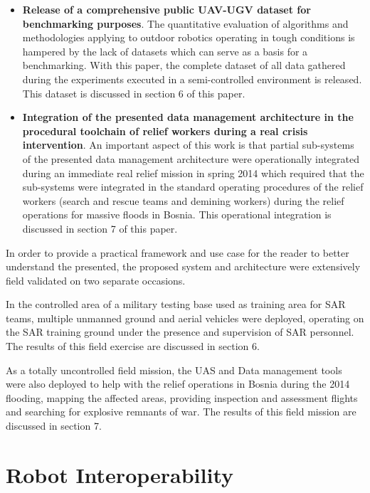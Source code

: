 \documentclass{article}
\begin{document}
\begin{itemize}
\item{\textbf{Release of a comprehensive public UAV-UGV dataset for benchmarking purposes}.
The quantitative evaluation of algorithms and methodologies applying to outdoor robotics operating in tough conditions is hampered by the lack of datasets which can serve as a basis for a benchmarking. With this paper, the complete dataset of all data gathered during the experiments executed in a semi-controlled environment is released. This dataset is discussed in section 6 of this paper.}
\item{\textbf{Integration of the presented data management architecture in the procedural toolchain of relief workers during a real crisis intervention}.
An important aspect of this work is that partial sub-systems of the presented data management architecture were operationally integrated during an immediate real relief mission in spring 2014 which required that the sub-systems were integrated in the standard operating procedures of the relief workers (search and rescue teams and demining workers) during the relief operations for massive floods in Bosnia. This operational integration is discussed in section 7 of this paper.}
\end{itemize}

In order to provide a practical framework and use case for the reader to better understand the presented, the proposed system and architecture were extensively field validated on two separate occasions.

In the controlled area of a military testing base used as training area for SAR teams, multiple unmanned ground and aerial vehicles were deployed, operating on the SAR training ground under the presence and supervision of SAR personnel. The results of this field exercise are discussed in section 6.

As a totally uncontrolled field mission, the UAS and Data management tools were also deployed to help with the relief operations in Bosnia during the 2014 flooding, mapping the affected areas, providing inspection and assessment flights and searching for explosive remnants of war. The results of this field mission are discussed in section 7.


\section{Robot Interoperability}
\end{document}
